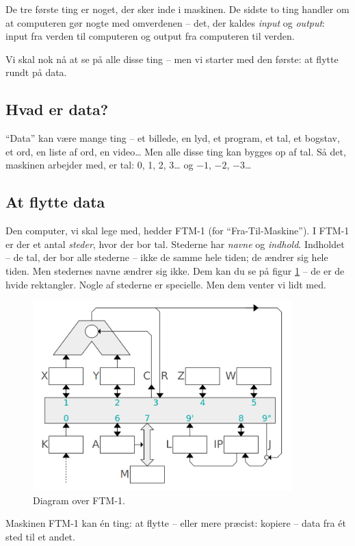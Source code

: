 \documentclass[a4paper]{article}
\begin{document}
De tre første ting er noget, der sker inde i maskinen.
De sidste to ting handler om at computeren gør nogte med omverdenen --
det, der kaldes \emph{input} og \emph{output}: input fra verden til
computeren og output fra computeren til verden.

Vi skal nok nå at se på alle disse ting -- men vi starter med den
første: at flytte rundt på data.

\subsection*{Hvad er data?}
``Data'' kan være mange ting -- et billede, en lyd, et program, et tal, et bogstav, et ord, en liste af ord, en video\ldots
Men alle disse ting kan bygges op af tal. Så det, maskinen arbejder med, er tal: 0, 1, 2, 3\ldots{} og $-1$, $-2$, $-3$\ldots

\subsection*{At flytte data}

Den computer, vi skal lege med, hedder FTM-1 (for ``Fra-Til-Maskine'').
I FTM-1 er der et antal \emph{steder}, hvor der bor tal.
Stederne har \emph{navne} og \emph{indhold}.
Indholdet -- de tal, der bor alle stederne -- ikke de samme hele
tiden; de ændrer sig hele tiden.
Men stedernes navne ændrer sig ikke. Dem kan du se på figur \ref{ftm1-arch} -- de er de hvide rektangler.
Nogle af stederne er specielle. Men dem venter vi lidt med.

\begin{figure}
  \label{ftm1-arch}
  \centering
  \includegraphics[width=10cm]{cpu}
  \caption{Diagram over FTM-1.}
\end{figure}

Maskinen FTM-1 kan én ting: at flytte -- eller mere præcist: kopiere
-- data fra ét sted til et andet.
\end{document}
